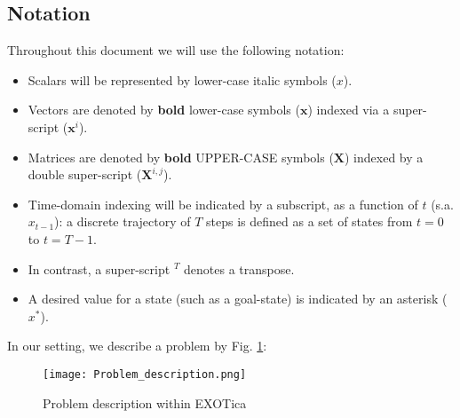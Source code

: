 \documentclass[12pt,a4paper,onecolumn]{article}
\begin{document}
\subsection{Notation}
Throughout this document we will use the following notation:
\begin{itemize}
\item Scalars will be represented by lower-case italic symbols ($x$).
\item Vectors are denoted by \textbf{bold} lower-case symbols ($\mathbf{x}$) indexed via a super-script ($\mathbf{x}^i$).
\item Matrices are denoted by \textbf{bold} UPPER-CASE symbols ($\mathbf{X}$) indexed by a double super-script ($\mathbf{X}^{i,j}$).
\item Time-domain indexing will be indicated by a subscript, as a function of $t$ (s.a. $x_{t-1}$): a discrete trajectory of $T$ steps is defined as a set of states from $t=0$ to $t=T-1$.
\item In contrast, a super-script $^T$ denotes a transpose.
\item A desired value for a state (such as a goal-state) is indicated by an asterisk ($x^*$).
\end{itemize}

\noindent In our setting, we describe a problem by Fig. \ref{FIG_PROBLEM_DESCRIPTION}:
\begin{figure}[!htp]
	\centering
    \texttt{[image: Problem\_description.png]}
    \caption{Problem description within EXOTica}
   	\label{FIG_PROBLEM_DESCRIPTION}
\end{figure}\\
\end{document}
